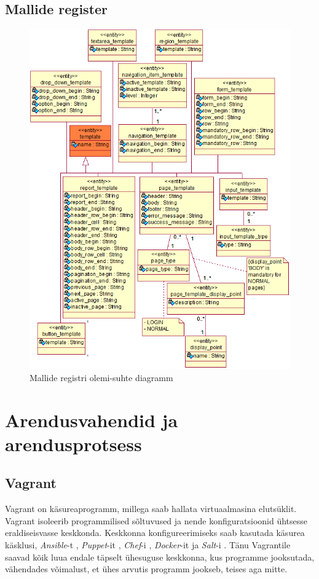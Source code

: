 \documentclass[a4paper,12pt]{article} %
\begin{document}
\subsection{Mallide register}
\begin{figure}[H]
\begin{center}
\includegraphics[bb=0 0 601 784,scale=1]{./diagrams/template-er-diagram.png}
\caption{Mallide registri olemi-suhte diagramm}
\label{fig_mallide_registri_olemi_suhte_diagramm}
\end{center}
\end{figure}

\section{Arendusvahendid ja arendusprotsess}
\subsection{Vagrant}
Vagrant on käsureaprogramm, millega saab hallata virtuaalmasina elutsüklit. Vagrant isoleerib programmilised sõltuvused ja nende konfiguratsioonid ühtsesse eraldiseisvasse keskkonda. Keskkonna konfigureerimiseks saab kasutada käsurea käsklusi, \textit{Ansible}-t \cite{Ansible}, \textit{Puppet}-it \cite{Puppet}, \textit{Chef}-i \cite{Chef}, \textit{Docker}-it \cite{Docker} ja \textit{Salt}-i \cite{Salt}. Tänu Vagrantile saavad kõik luua endale täpselt ühesuguse keskkonna, kus programme jooksutada, vähendades võimalust, et ühes arvutis programm jookseb, teises aga mitte. \cite{Why_Vagrant}
\end{document}
